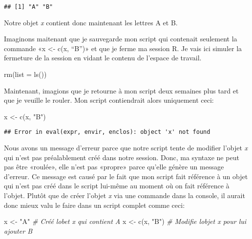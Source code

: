 \documentclass[
]{book}
\newenvironment{Shaded}{\begin{snugshade}}{\end{snugshade}}
\newcommand{\AttributeTok}[1]{\textcolor[rgb]{0.77,0.63,0.00}{#1}}
\newcommand{\CommentTok}[1]{\textcolor[rgb]{0.56,0.35,0.01}{\textit{#1}}}
\newcommand{\FunctionTok}[1]{\textcolor[rgb]{0.00,0.00,0.00}{#1}}
\newcommand{\NormalTok}[1]{#1}
\newcommand{\OtherTok}[1]{\textcolor[rgb]{0.56,0.35,0.01}{#1}}
\newcommand{\StringTok}[1]{\textcolor[rgb]{0.31,0.60,0.02}{#1}}
\begin{document}
\begin{verbatim}
## [1] "A" "B"
\end{verbatim}

Notre objet \emph{x} contient donc maintenant les lettres A et B.

Imaginons maitenant que je sauvegarde mon script qui contenait seulement la commande «x \textless- c(x, ``B'')» et que je ferme ma session R. Je vais ici simuler la fermeture de la session en vidant le contenu de l'espace de travail.

\begin{Shaded}
\begin{Highlighting}[]
\FunctionTok{rm}\NormalTok{(}\AttributeTok{list =} \FunctionTok{ls}\NormalTok{())}
\end{Highlighting}
\end{Shaded}

Maintenant, imagions que je retourne à mon script deux semaines plus tard et que je veuille le rouler. Mon script contiendrait alors uniquement ceci:

\begin{Shaded}
\begin{Highlighting}[]
\NormalTok{x }\OtherTok{\textless{}{-}} \FunctionTok{c}\NormalTok{(x, }\StringTok{"B"}\NormalTok{)}
\end{Highlighting}
\end{Shaded}

\begin{verbatim}
## Error in eval(expr, envir, enclos): object 'x' not found
\end{verbatim}

Nous avons un message d'erreur parce que notre script tente de modifier l'objet \emph{x} qui n'est pas préalablement créé dans notre session. Donc, ma syntaxe ne peut pas être «roulée», elle n'est pas «propre» parce qu'elle génère un message d'erreur. Ce message est causé par le fait que mon script fait référence à un objet qui n'est pas créé dans le script lui-même au moment où on fait référence à l'objet. Plutôt que de créer l'objet \emph{x} via une commande dans la console, il aurait donc mieux valu le faire dans un script complet comme ceci:

\begin{Shaded}
\begin{Highlighting}[]
\NormalTok{x }\OtherTok{\textless{}{-}} \StringTok{"A"} \CommentTok{\# Créé l\textquotesingle{}obet x qui contient A}
\NormalTok{x }\OtherTok{\textless{}{-}} \FunctionTok{c}\NormalTok{(x, }\StringTok{"B"}\NormalTok{) }\CommentTok{\# Modifie l\textquotesingle{}objet x pour lui ajouter B}
\end{Highlighting}
\end{Shaded}
\end{document}

